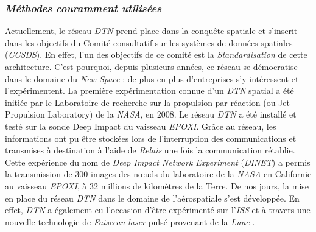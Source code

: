 \documentclass[conference]{IEEEtran}
\begin{document}
\subsubsection{\textbf{\textit{Méthodes couramment utilisées}}}
Actuellement, le réseau \emph{DTN} prend place dans la conquête spatiale et s’inscrit dans les objectifs du Comité consultatif sur les systèmes de données spatiales (\emph{CCSDS}). En effet, l’un des objectifs de ce comité est la \emph{Standardisation} de cette architecture. C’est pourquoi, depuis plusieurs années, ce réseau se démocratise dans le domaine du \emph{New Space} : de plus en plus d’entreprises s’y intéressent et l’expérimentent.
La première expérimentation connue d’un \emph{DTN} spatial a été initiée par le Laboratoire de recherche sur la propulsion par réaction (ou Jet Propulsion Laboratory) de la \emph{NASA}, en 2008. Le réseau \emph{DTN} a été installé et testé sur la sonde Deep Impact du vaisseau \emph{EPOXI}. Grâce au réseau, les informations ont pu être stockées lors de l’interruption des communications et transmises à destination à l’aide de \emph{Relais} une fois la communication rétablie.
Cette expérience du nom de \emph{Deep Impact Network Experiment} (\emph{DINET}) a permis la transmission de 300 images des nœuds du laboratoire de la \emph{NASA} en Californie au vaisseau \emph{EPOXI}, à 32 millions de kilomètres de la Terre.
De nos jours, la mise en place du réseau \emph{DTN} dans le domaine de l’aérospatiale s’est développée. En effet, \emph{DTN} a également eu l’occasion d’être expérimenté sur l’\emph{ISS} et à travers une nouvelle technologie de \emph{Faisceau laser} pulsé provenant de la \emph{Lune} \cite{b8}.
\end{document}
